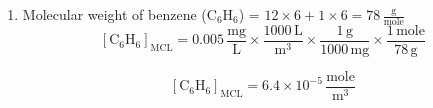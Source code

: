 \documentclass[12pt,letterpaper]{article}
\begin{document}
\begin{enumerate}
\begin{enumerate}
\item
Molecular weight of benzene (C$_6$H$_6$) = $\mathrm{12\times 6 + 1\times 6 = 78\,\frac{g}{mole}}$
\begin{equation*}
\mathrm{[C_6H_6]_{MCL} = 0.005 \, \frac{mg}{L}\times \frac{1000 \, L}{m^3}\times \frac{1 \, g}{1000 \, mg}\times \frac{1 \, mole}{78 \, g}}
\end{equation*}

\begin{equation*}
\mathrm{[C_6H_6]_{MCL} = 6.4\times 10^{-5} \, \frac{mole}{m^3}}
\end{equation*}


\end{enumerate}

\end{enumerate}
\end{document}
